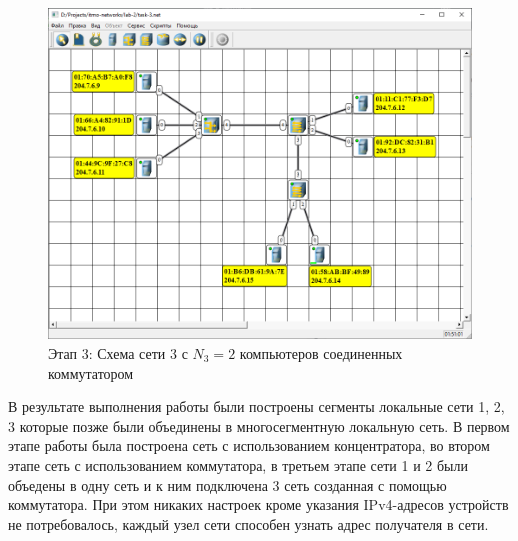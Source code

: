 \begin{figure}[H]
    \centering
    \includegraphics[width=1\linewidth]{res/task-3.png}
    \caption{Этап 3: Схема сети 3 с $N_3=2$ компьютеров соединенных коммутатором}
    \label{fig:task-3}
\end{figure}




В результате выполнения работы были построены сегменты локальные сети 1, 2, 3 которые позже были объединены в многосегментную локальную сеть. В первом этапе работы была построена сеть с использованием концентратора, во втором этапе сеть с использованием коммутатора, в третьем этапе сети 1 и 2 были объедены в одну сеть и к ним подключена 3 сеть созданная с помощью коммутатора. При этом никаких настроек кроме указания IPv4-адресов устройств не потребовалось, каждый узел сети способен узнать адрес получателя в сети.




